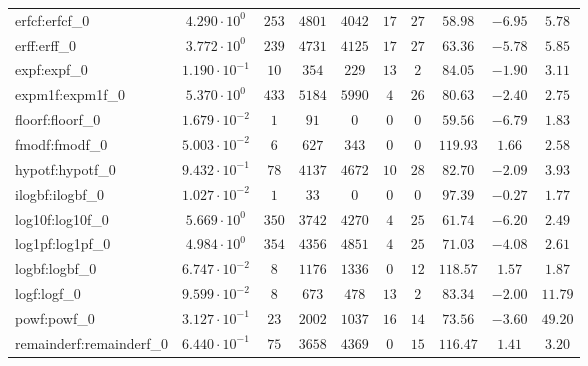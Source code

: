 \begin{tabular}{|l|c|c|c|c|c|c|c|c|c|}
erfcf:erfcf\_0           & $ 4.290 \cdot 10^{0}  $ & $ 253    $ & $ 4801   $ & $ 4042   $ & $ 17  $ & $ 27  $ & $ 58.98       $ & $ -6.95   $ & $ 5.78    $ \\
erff:erff\_0             & $ 3.772 \cdot 10^{0}  $ & $ 239    $ & $ 4731   $ & $ 4125   $ & $ 17  $ & $ 27  $ & $ 63.36       $ & $ -5.78   $ & $ 5.85    $ \\
expf:expf\_0             & $ 1.190 \cdot 10^{-1} $ & $ 10     $ & $ 354    $ & $ 229    $ & $ 13  $ & $ 2   $ & $ 84.05       $ & $ -1.90   $ & $ 3.11    $ \\
expm1f:expm1f\_0         & $ 5.370 \cdot 10^{0}  $ & $ 433    $ & $ 5184   $ & $ 5990   $ & $ 4   $ & $ 26  $ & $ 80.63       $ & $ -2.40   $ & $ 2.75    $ \\
floorf:floorf\_0         & $ 1.679 \cdot 10^{-2} $ & $ 1      $ & $ 91     $ & $ 0      $ & $ 0   $ & $ 0   $ & $ 59.56       $ & $ -6.79   $ & $ 1.83    $ \\
fmodf:fmodf\_0           & $ 5.003 \cdot 10^{-2} $ & $ 6      $ & $ 627    $ & $ 343    $ & $ 0   $ & $ 0   $ & $ 119.93      $ & $ 1.66    $ & $ 2.58    $ \\
hypotf:hypotf\_0         & $ 9.432 \cdot 10^{-1} $ & $ 78     $ & $ 4137   $ & $ 4672   $ & $ 10  $ & $ 28  $ & $ 82.70       $ & $ -2.09   $ & $ 3.93    $ \\
ilogbf:ilogbf\_0         & $ 1.027 \cdot 10^{-2} $ & $ 1      $ & $ 33     $ & $ 0      $ & $ 0   $ & $ 0   $ & $ 97.39       $ & $ -0.27   $ & $ 1.77    $ \\
log10f:log10f\_0         & $ 5.669 \cdot 10^{0}  $ & $ 350    $ & $ 3742   $ & $ 4270   $ & $ 4   $ & $ 25  $ & $ 61.74       $ & $ -6.20   $ & $ 2.49    $ \\
log1pf:log1pf\_0         & $ 4.984 \cdot 10^{0}  $ & $ 354    $ & $ 4356   $ & $ 4851   $ & $ 4   $ & $ 25  $ & $ 71.03       $ & $ -4.08   $ & $ 2.61    $ \\
logbf:logbf\_0           & $ 6.747 \cdot 10^{-2} $ & $ 8      $ & $ 1176   $ & $ 1336   $ & $ 0   $ & $ 12  $ & $ 118.57      $ & $ 1.57    $ & $ 1.87    $ \\
logf:logf\_0             & $ 9.599 \cdot 10^{-2} $ & $ 8      $ & $ 673    $ & $ 478    $ & $ 13  $ & $ 2   $ & $ 83.34       $ & $ -2.00   $ & $ 11.79   $ \\
powf:powf\_0             & $ 3.127 \cdot 10^{-1} $ & $ 23     $ & $ 2002   $ & $ 1037   $ & $ 16  $ & $ 14  $ & $ 73.56       $ & $ -3.60   $ & $ 49.20   $ \\
remainderf:remainderf\_0 & $ 6.440 \cdot 10^{-1} $ & $ 75     $ & $ 3658   $ & $ 4369   $ & $ 0   $ & $ 15  $ & $ 116.47      $ & $ 1.41    $ & $ 3.20    $ \\

\end{tabular}
